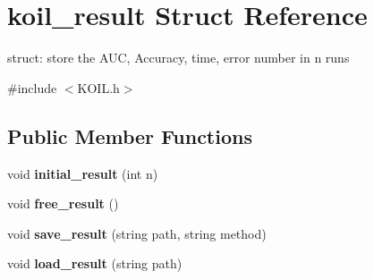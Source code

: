 \hypertarget{structkoil__result}{\section{koil\+\_\+result Struct Reference}
\label{structkoil__result}
}


struct\+: store the A\+U\+C, Accuracy, time, error number in n runs  




{\ttfamily \#include $<$K\+O\+I\+L.\+h$>$}

\subsection*{Public Member Functions}
\begin{DoxyCompactItemize}
\item 
\hypertarget{structkoil__result_acd5932a5889bc1f2d3fd195cd2c75184}{void {\bfseries initial\+\_\+result} (int n)}\label{structkoil__result_acd5932a5889bc1f2d3fd195cd2c75184}

\item 
\hypertarget{structkoil__result_ad95b7204bd1ccc07a90b31034a88c23c}{void {\bfseries free\+\_\+result} ()}\label{structkoil__result_ad95b7204bd1ccc07a90b31034a88c23c}

\item 
\hypertarget{structkoil__result_a192567303ac10108437d8b9ae0485b0c}{void {\bfseries save\+\_\+result} (string path, string method)}\label{structkoil__result_a192567303ac10108437d8b9ae0485b0c}

\item 
\hypertarget{structkoil__result_a2fdd873c8e257ac3c909ae0ddb02663a}{void {\bfseries load\+\_\+result} (string path)}\label{structkoil__result_a2fdd873c8e257ac3c909ae0ddb02663a}

\end{DoxyCompactItemize}
